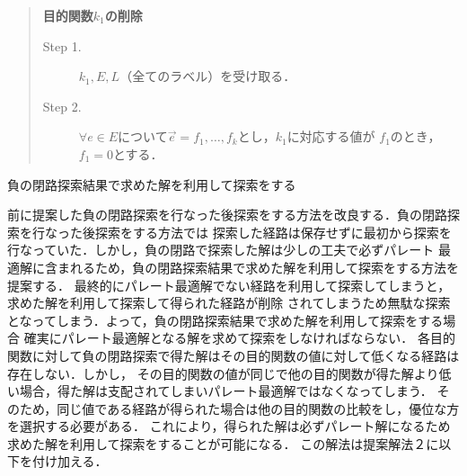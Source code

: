 \documentclass[12pt]{optlab-bachelor}
\begin{document}
\begin{quote}
  \textbf{目的関数$k_1$の削除}
  \begin{description}
    \item[Step 1.] $k_1,E,L$（全てのラベル）を受け取る．
    \item[Step 2.] $\forall e \in E$について$\vec{e}={f_1,\ldots,f_k}$とし，$k_1$に対応する値が
    $f_1$のとき，$f_1=0$とする．
  \end{description}
\end{quote}

\begin{description}
  \item[負の閉路探索結果で求めた解を利用して探索をする]
\end{description}

前に提案した負の閉路探索を行なった後探索をする方法を改良する．負の閉路探索を行なった後探索をする方法では
探索した経路は保存せずに最初から探索を行なっていた．しかし，負の閉路で探索した解は少しの工夫で必ずパレート
最適解に含まれるため，負の閉路探索結果で求めた解を利用して探索をする方法を提案する．
最終的にパレート最適解でない経路を利用して探索してしまうと，求めた解を利用して探索して得られた経路が削除
されてしまうため無駄な探索となってしまう．よって，負の閉路探索結果で求めた解を利用して探索をする場合
確実にパレート最適解となる解を求めて探索をしなければならない．
各目的関数に対して負の閉路探索で得た解はその目的関数の値に対して低くなる経路は存在しない．しかし，
その目的関数の値が同じで他の目的関数が得た解より低い場合，得た解は支配されてしまいパレート最適解ではなくなってしまう．
そのため，同じ値である経路が得られた場合は他の目的関数の比較をし，優位な方を選択する必要がある．
これにより，得られた解は必ずパレート解になるため求めた解を利用して探索をすることが可能になる．
この解法は提案解法２に以下を付け加える．
\end{document}
